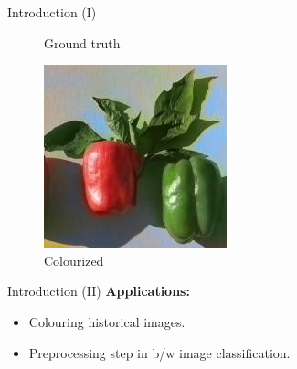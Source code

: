 \documentclass{beamer}
\begin{document}
\begin{frame}{Introduction (I)}
\begin{figure}[!htb]
      \caption{Ground truth}
    \endminipage\hfill
      \includegraphics[width=\linewidth]{resources/colored.jpg}
      \caption{Colourized}
    \endminipage
  \end{figure}
\end{frame}

\begin{frame}{Introduction (II)}
  \textbf{Applications:}
    \begin{itemize}
        \item Colouring historical images.
        \item Preprocessing step in b/w image classification.
    \end{itemize}
\end{frame}

\end{document}
